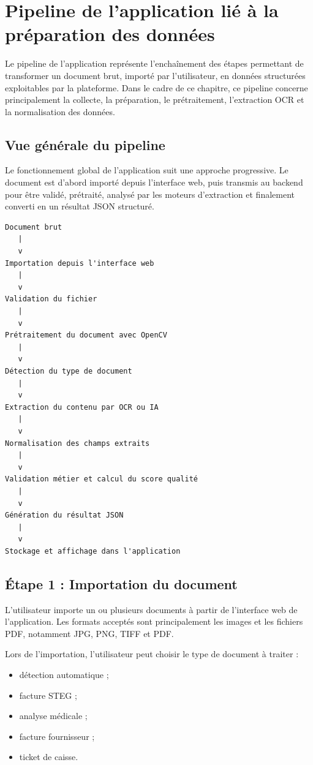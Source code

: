 \section{Pipeline de l'application lié à la préparation des données}

Le pipeline de l'application représente l'enchaînement des étapes permettant de transformer un document brut, importé par l'utilisateur, en données structurées exploitables par la plateforme. Dans le cadre de ce chapitre, ce pipeline concerne principalement la collecte, la préparation, le prétraitement, l'extraction OCR et la normalisation des données.

\subsection{Vue générale du pipeline}

Le fonctionnement global de l'application suit une approche progressive. Le document est d'abord importé depuis l'interface web, puis transmis au backend pour être validé, prétraité, analysé par les moteurs d'extraction et finalement converti en un résultat JSON structuré.

\begin{verbatim}
Document brut
   |
   v
Importation depuis l'interface web
   |
   v
Validation du fichier
   |
   v
Prétraitement du document avec OpenCV
   |
   v
Détection du type de document
   |
   v
Extraction du contenu par OCR ou IA
   |
   v
Normalisation des champs extraits
   |
   v
Validation métier et calcul du score qualité
   |
   v
Génération du résultat JSON
   |
   v
Stockage et affichage dans l'application
\end{verbatim}

\subsection{Étape 1 : Importation du document}

L'utilisateur importe un ou plusieurs documents à partir de l'interface web de l'application. Les formats acceptés sont principalement les images et les fichiers PDF, notamment JPG, PNG, TIFF et PDF.

Lors de l'importation, l'utilisateur peut choisir le type de document à traiter :

\begin{itemize}
\item détection automatique ;
\item facture STEG ;
\item analyse médicale ;
\item facture fournisseur ;
\item ticket de caisse.
\end{itemize}

